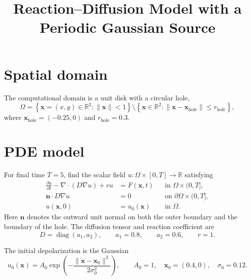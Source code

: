 \documentclass[11pt]{article}
\title{Reaction--Diffusion Model with a Periodic Gaussian Source}
\author{}
\date{}
\newcommand{\R}{\mathbb{R}}
\begin{document}
\maketitle

\section{Spatial domain}

The computational domain is a unit disk with a circular hole,
\begin{equation}
  \Omega
  = \left\{\boldsymbol{x}=(x,y)\in\R^2:
      \lVert\boldsymbol{x}\rVert < 1\right\}
    \setminus
    \left\{\boldsymbol{x}\in\R^2:
      \lVert\boldsymbol{x}-\boldsymbol{x}_{\mathrm{hole}}\rVert
      \leq r_{\mathrm{hole}}\right\},
\end{equation}
where
\(
  \boldsymbol{x}_{\mathrm{hole}}=(-0.25,0)
\)
and
\(
  r_{\mathrm{hole}}=0.3
\).

\section{PDE model}

For final time \(T=5\), find the scalar field
\(u:\Omega\times[0,T]\to\R\) satisfying
\begin{align}
  \frac{\partial u}{\partial t}
  - \nabla\!\cdot\!\left(D\nabla u\right)
  + r u
  &= F(\boldsymbol{x},t)
  && \text{in }\Omega\times(0,T],
  \label{eq:pde}\\
  \boldsymbol{n}\cdot D\nabla u
  &=0
  && \text{on }\partial\Omega\times(0,T],
  \label{eq:neumann}\\
  u(\boldsymbol{x},0)
  &=u_0(\boldsymbol{x})
  && \text{in }\Omega.
  \label{eq:initial}
\end{align}
Here \(\boldsymbol{n}\) denotes the outward unit normal on both the outer
boundary and the boundary of the hole.  The diffusion tensor and reaction
coefficient are
\begin{equation}
  D=\operatorname{diag}(a_1,a_2),
  \qquad a_1=0.8,
  \qquad a_2=0.6,
  \qquad r=1.
\end{equation}

The initial depolarization is the Gaussian
\begin{equation}
  u_0(\boldsymbol{x})
  = A_0
    \exp\!\left(
      -\frac{\lVert\boldsymbol{x}-\boldsymbol{x}_0\rVert^2}
             {2\sigma_0^2}
    \right),
  \qquad
  A_0=1,
  \quad
  \boldsymbol{x}_0=(0.4,0),
  \quad
  \sigma_0=0.12.
\end{equation}
\end{document}
